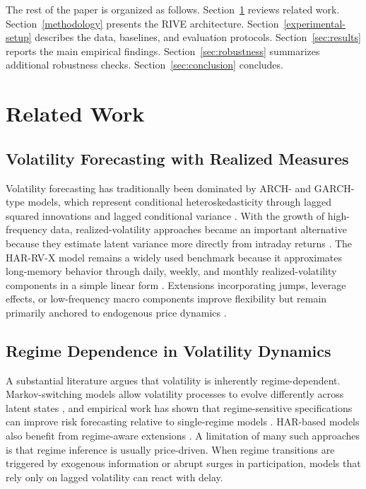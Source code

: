 \documentclass[review]{elsarticle}
\begin{document}
The rest of the paper is organized as follows. Section~\ref{literature-review} reviews related work. Section~\ref{methodology} presents the RIVE architecture. Section~\ref{experimental-setup} describes the data, baselines, and evaluation protocols. Section~\ref{sec:results} reports the main empirical findings. Section~\ref{sec:robustness} summarizes additional robustness checks. Section~\ref{sec:conclusion} concludes.

\section{Related Work}\label{literature-review}

\subsection{Volatility Forecasting with Realized Measures}\label{econometric-volatility-models}

Volatility forecasting has traditionally been dominated by ARCH- and GARCH-type models, which represent conditional heteroskedasticity through lagged squared innovations and lagged conditional variance \cite{engle1982,bollerslev1986}. With the growth of high-frequency data, realized-volatility approaches became an important alternative because they estimate latent variance more directly from intraday returns \cite{andersen2001}. The HAR-RV-X model remains a widely used benchmark because it approximates long-memory behavior through daily, weekly, and monthly realized-volatility components in a simple linear form \cite{corsi2009}. Extensions incorporating jumps, leverage effects, or low-frequency macro components improve flexibility but remain primarily anchored to endogenous price dynamics \cite{andersen2007,patton2015,engle2008}.

\subsection{Regime Dependence in Volatility Dynamics}\label{regime-switching}

A substantial literature argues that volatility is inherently regime-dependent. Markov-switching models allow volatility processes to evolve differently across latent states \cite{hamilton1989}, and empirical work has shown that regime-sensitive specifications can improve risk forecasting relative to single-regime models \cite{ang2002,ardia2018}. HAR-based models also benefit from regime-aware extensions \cite{ma2019}. A limitation of many such approaches is that regime inference is usually price-driven. When regime transitions are triggered by exogenous information or abrupt surges in participation, models that rely only on lagged volatility can react with delay.
\end{document}
